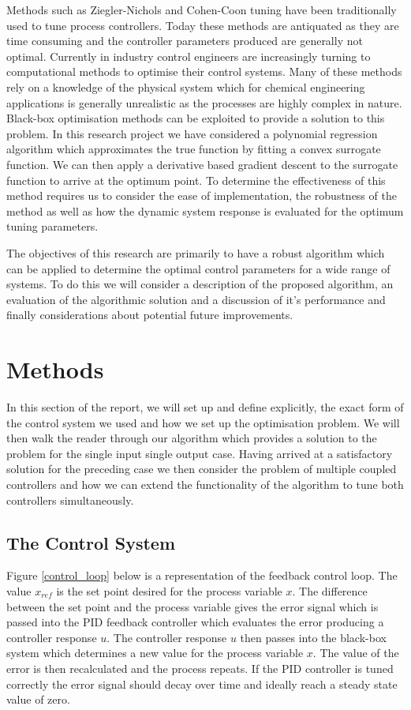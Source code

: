 \documentclass[conference]{IEEEtran}
\theoremstyle{definition}
\begin{document}
Methods such as Ziegler-Nichols \cite{Ziegler} and Cohen-Coon tuning \cite{Cohen} have been traditionally used to tune process controllers. Today these methods are  antiquated as they are time consuming and the controller parameters produced are generally not optimal. Currently in industry control engineers are increasingly turning to computational methods to optimise their control systems. Many of these methods rely on a knowledge of the physical system which for chemical engineering applications is generally unrealistic as the processes are highly complex in nature. Black-box optimisation methods can be exploited to provide a solution to this problem. In this research project we have considered a polynomial regression algorithm which approximates the true function by fitting a convex surrogate function. We can then apply a derivative based gradient descent to the surrogate function to arrive at the optimum point. To determine the effectiveness of this method requires us to consider the ease of implementation, the robustness of the method as well as how the dynamic system response is evaluated for the optimum tuning parameters.

The objectives of this research are primarily to have a robust algorithm which can be applied to determine the optimal control parameters for a wide range of systems. To do this we will consider a description of the proposed algorithm, an evaluation of the algorithmic solution and a discussion of it's performance and finally considerations about potential future improvements.
\section{Methods}
\noindent In this section of the report, we will set up and define explicitly, the exact form of the control system we used and how we set up the optimisation problem. We will then walk the reader through our algorithm which provides a solution to the problem for the single input single output case. Having arrived at a satisfactory solution for the preceding case we then consider the problem of multiple coupled controllers and how we can extend the functionality of the algorithm to tune both controllers simultaneously. 
\subsection{The Control System}
\noindent Figure \ref{control_loop} below is a representation of the feedback control loop. The value $x_{ref}$ is the set point desired for the process variable $x$. The difference between the set point and the process variable gives the error signal which is passed into the PID feedback controller which evaluates the error producing a controller response $u$. The controller response $u$ then passes into the black-box system which determines a new value for the process variable $x$. The value of the error is then recalculated and the process repeats. If the PID controller is tuned correctly the error signal should decay over time and ideally reach a steady state value of zero. 
\end{document}
